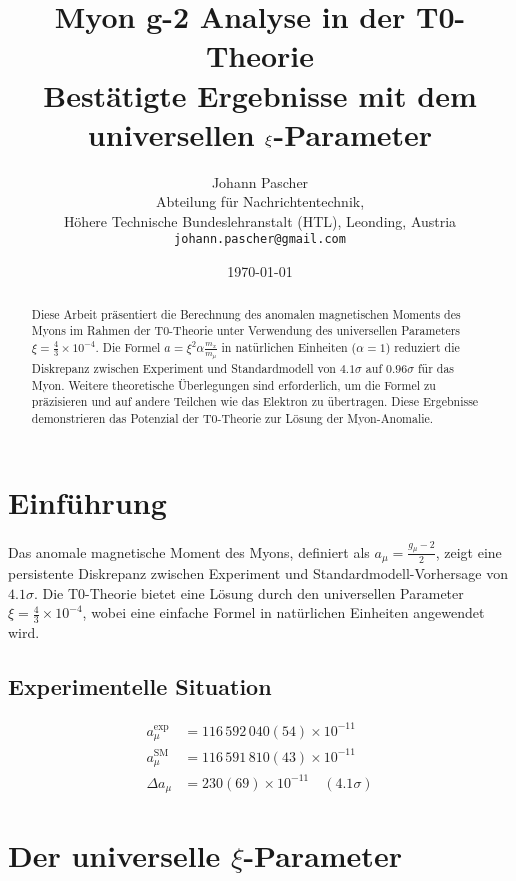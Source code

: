 \documentclass[12pt,a4paper]{article}
\title{Myon g-2 Analyse in der T0-Theorie \\
	Bestätigte Ergebnisse mit dem universellen $\xipar$-Parameter}
\author{Johann Pascher\\
	Abteilung für Nachrichtentechnik, \\Höhere Technische Bundeslehranstalt (HTL), Leonding, Austria\\
	\texttt{johann.pascher@gmail.com}}
\date{\today}
\newcommand{\xipar}{\xi}
\begin{document}
	
	\maketitle
	
	\begin{abstract}
		Diese Arbeit präsentiert die Berechnung des anomalen magnetischen Moments des Myons im Rahmen der T0-Theorie unter Verwendung des universellen Parameters \(\xipar = \frac{4}{3} \times 10^{-4}\). Die Formel \(a = \xipar^2 \alpha \frac{m_x}{m_\mu}\) in natürlichen Einheiten (\(\alpha = 1\)) reduziert die Diskrepanz zwischen Experiment und Standardmodell von \(4.1\sigma\) auf \(0.96\sigma\) für das Myon. Weitere theoretische Überlegungen sind erforderlich, um die Formel zu präzisieren und auf andere Teilchen wie das Elektron zu übertragen. Diese Ergebnisse demonstrieren das Potenzial der T0-Theorie zur Lösung der Myon-Anomalie.
	\end{abstract}
	
	\tableofcontents
	\newpage
	
	\section{Einführung}
	
	Das anomale magnetische Moment des Myons, definiert als \(a_\mu = \frac{g_\mu - 2}{2}\), zeigt eine persistente Diskrepanz zwischen Experiment und Standardmodell-Vorhersage von \(4.1\sigma\). Die T0-Theorie bietet eine Lösung durch den universellen Parameter \(\xipar = \frac{4}{3} \times 10^{-4}\), wobei eine einfache Formel in natürlichen Einheiten angewendet wird.
	
	\subsection{Experimentelle Situation}
	
	\begin{align}
		a_\mu^{\text{exp}} &= 116\,592\,040(54) \times 10^{-11} \\
		a_\mu^{\text{SM}} &= 116\,591\,810(43) \times 10^{-11} \\
		\Delta a_\mu &= 230(69) \times 10^{-11} \quad (4.1\sigma)
	\end{align}
	
	\section{Der universelle $\xipar$-Parameter}
	
\end{document}
